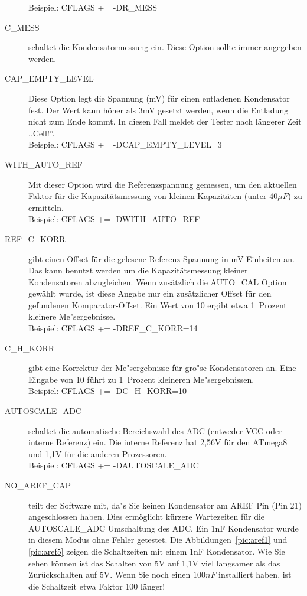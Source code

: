 \begin{description}
Beispiel: CFLAGS += -DR\_MESS
  \item[C\_MESS] schaltet die Kondensatormessung ein.
 Diese Option sollte immer angegeben werden.\\
  \item[CAP\_EMPTY\_LEVEL] Diese Option legt die Spannung (mV) f\"ur einen entladenen Kondensator fest.
Der Wert kann h\"oher als 3mV gesetzt werden, wenn die Entladung nicht zum Ende kommt. In diesen Fall meldet der Tester nach l\"angerer Zeit ,,Cell!''.\\
Beispiel: CFLAGS += -DCAP\_EMPTY\_LEVEL=3
  \item[WITH\_AUTO\_REF] Mit dieser Option wird die Referenzspannung gemessen, um den aktuellen Faktor f\"ur die Kapazit\"atsmessung 
von kleinen Kapazit\"aten (unter \(40\mu F\)) zu ermitteln.\\
Beispiel:  CFLAGS += -DWITH\_AUTO\_REF
  \item[REF\_C\_KORR] gibt einen Offset f\"ur die gelesene Referenz-Spannung in mV Einheiten an.
Das kann benutzt werden um die Kapazit\"atsmessung kleiner Kondensatoren abzugleichen.
Wenn zus\"atzlich die AUTO\_CAL Option gew\"ahlt wurde, ist diese Angabe nur ein zus\"atzlicher Offset f\"ur
den gefundenen Komparator-Offset.
Ein Wert von 10 ergibt etwa 1~Prozent kleinere Me"sergebnisse.\\
Beispiel:  CFLAGS += -DREF\_C\_KORR=14
  \item[C\_H\_KORR] gibt eine Korrektur der Me"sergebnisse f\"ur gro"se Kondensatoren an.
Eine Eingabe von 10 f\"uhrt zu 1~Prozent kleineren Me"sergebnissen.\\
Beispiel:  CFLAGS += -DC\_H\_KORR=10
  \item[AUTOSCALE\_ADC] schaltet die automatische Bereichswahl des ADC (entweder VCC oder interne Referenz) ein.
Die interne Referenz hat 2,56V f\"ur den ATmega8 und 1,1V f\"ur die anderen Prozessoren.\\
Beispiel: CFLAGS += -DAUTOSCALE\_ADC
  \item[NO\_AREF\_CAP] teilt der Software mit, da"s Sie keinen Kondensator am AREF Pin (Pin 21) angeschlossen haben.
Dies erm\"oglicht k\"urzere Wartezeiten f\"ur die AUTOSCALE\_ADC Umschaltung des ADC.
Ein 1nF Kondensator wurde in diesem Modus ohne Fehler getestet.
Die Abbildungen~\ref{pic:aref1} und \ref{pic:aref5} zeigen die Schaltzeiten mit einem 1nF Kondensator.
Wie Sie sehen k\"onnen ist das Schalten von 5V auf 1,1V viel langsamer als das Zur\"uckschalten auf 5V.
Wenn Sie noch einen \(100 nF\) installiert haben, ist die Schaltzeit etwa Faktor 100 l\"anger!\\

\end{description}
